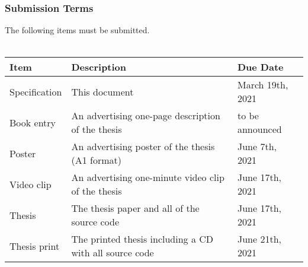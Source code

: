 \subsubsection{Submission Terms}
The following items must be submitted.
\\\\
\noindent
\begin{tabular}{|l|l|l|}
    \hline
    \textbf{Item}    & \textbf{Description}                                      & \textbf{Due Date}     \\ \hline
    Specification    & This document                                             & March 19th, 2021      \\ \hline
    Book entry       & An advertising one-page description of the thesis         & to be announced       \\ \hline
    Poster           & An advertising poster of the thesis (A1 format)           & June 7th, 2021        \\ \hline
    Video clip       & An advertising one-minute video clip of the thesis        & June 17th, 2021       \\ \hline
    Thesis           & The thesis paper and all of the source code               & June 17th, 2021       \\ \hline
    Thesis print     & The printed thesis including a CD with all source code    & June 21th, 2021       \\ \hline
\end{tabular}
\newline
\noindent